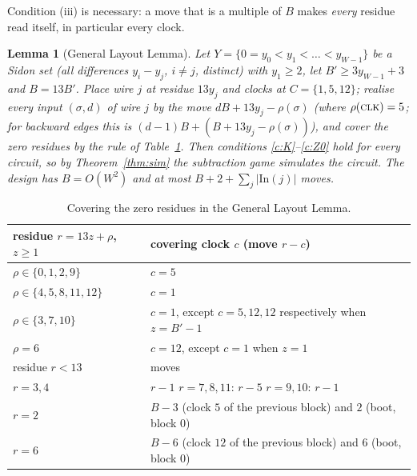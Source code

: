 \documentclass[11pt]{article}
\newtheorem{lemma}[theorem]{Lemma}
\theoremstyle{definition}
\begin{document}
Condition (iii) is necessary: a move that is a multiple of $B$ makes \emph{every} residue read
itself, in particular every clock.

\begin{lemma}[General Layout Lemma]\label{lem:gll}
Let $Y=\{0=y_0<y_1<\dots<y_{W-1}\}$ be a Sidon set (all differences $y_i-y_j$, $i\ne j$, distinct)
with $y_1\ge 2$, let $B'\ge 3y_{W-1}+3$ and $B=13B'$.  Place wire $j$ at residue $13y_j$ and clocks at
$C=\{1,5,12\}$; realise every input $(\sigma,d)$ of wire $j$ by the move $dB+13y_j-\rho(\sigma)$
(where $\rho(\textsc{clk})=5$; for backward edges this is $(d-1)B+(B+13y_j-\rho(\sigma))$), and cover
the zero residues by the rule of Table~\ref{tab:cover}.  Then conditions \ref{c:K}--\ref{c:Z0} hold for
every circuit, so by Theorem~\ref{thm:sim} the subtraction game simulates the circuit.  The design has
$B=O(W^2)$ and at most $B+2+\sum_j|\mathrm{In}(j)|$ moves.
\end{lemma}

\begin{table}[t]
\centering\small
\begin{tabular}{ll}
\toprule
residue $r=13z+\rho$, $z\ge1$ & covering clock $c$ (move $r-c$)\\
\midrule
$\rho\in\{0,1,2,9\}$ & $c=5$\\
$\rho\in\{4,5,8,11,12\}$ & $c=1$\\
$\rho\in\{3,7,10\}$ & $c=1$, except $c=5,12,12$ respectively when $z=B'-1$\\
$\rho=6$ & $c=12$, except $c=1$ when $z=1$\\
\midrule
residue $r<13$ & moves\\
\midrule
$r=3,4$ & $r-1$ \qquad $r=7,8,11$: $r-5$ \qquad $r=9,10$: $r-1$\\
$r=2$ & $B-3$ (clock $5$ of the previous block) and $2$ (boot, block $0$)\\
$r=6$ & $B-6$ (clock $12$ of the previous block) and $6$ (boot, block $0$)\\
\bottomrule
\end{tabular}
\caption{Covering the zero residues in the General Layout Lemma.}
\label{tab:cover}
\end{table}
\end{document}
